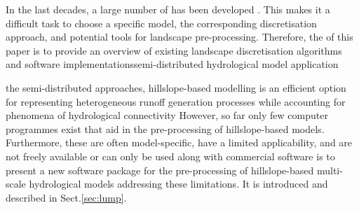 In the last decades, a large number of \DIFdelbegin {}\DIFdelend \DIFaddbegin {}\DIFaddend has been developed \DIFdelbegin {}\DIFdelend \DIFaddbegin {}\DIFaddend .
This makes it a difficult task to choose a specific model, the corresponding discretisation approach, and potential tools for landscape pre-processing.
Therefore, the \DIFdelbegin {}\DIFdelend \DIFaddbegin \emph{} \DIFaddend of this paper is to provide an overview of existing landscape discretisation algorithms and software implementations\DIFdelbegin {}\DIFdelend \DIFaddbegin {}\DIFaddend semi-distributed hydrological model application \DIFdelbegin {}\DIFdelend \DIFaddbegin {}\DIFaddend 

\DIFdelbegin {}\DIFdelend \DIFaddbegin {}\DIFaddend the semi-distributed approaches, hillslope-based modelling is an efficient option for representing heterogeneous runoff generation processes while accounting for phenomena of hydrological connectivity \DIFdelbegin {}\DIFdelend \DIFaddbegin {}\DIFaddend However, so far only few computer programmes exist that aid in the pre-processing of hillslope-based models.
Furthermore, these are often model-specific, have a limited applicability, and are not freely available or can only be used along with commercial software \DIFdelbegin {}\DIFdelend \DIFaddbegin {}\emph{} \DIFaddend is to present a new software package for the pre-processing of hillslope-based multi-scale hydrological models addressing these limitations.
It is introduced and described in Sect.\DIFaddbegin \DIFadd{\ }\DIFaddend \ref{sec:lump}.

